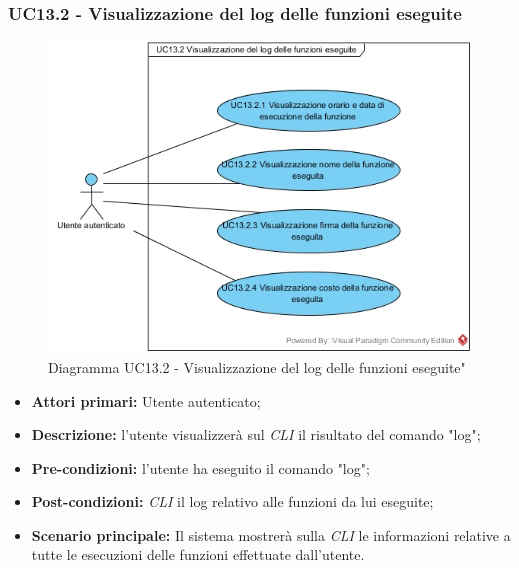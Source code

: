 \subsubsection{UC13.2 - Visualizzazione del log delle funzioni eseguite}
\begin{figure}[h]
	\centering
	\includegraphics[width=0.7\linewidth]{res/img/UC13.2.jpg}
	\caption{Diagramma UC13.2 - Visualizzazione del log delle funzioni eseguite"}
\end{figure}
\begin{itemize}
	\item \textbf{Attori primari:} Utente autenticato;
	\item \textbf{Descrizione:} l'utente visualizzerà sul \textit{CLI\glo} il risultato del comando "log";
	\item \textbf{Pre-condizioni:} l'utente ha eseguito il comando "log";
	\item \textbf{Post-condizioni:} \textit{CLI\glo} il log relativo alle funzioni da lui eseguite;
	\item \textbf{Scenario principale:} Il sistema mostrerà sulla \textit{CLI\glo} le informazioni relative a tutte le esecuzioni delle funzioni effettuate dall'utente.
\end{itemize}
